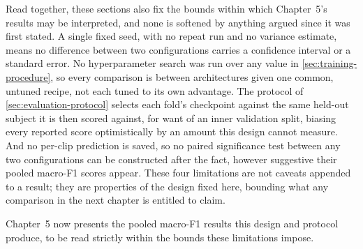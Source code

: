 Read together, these sections also fix the bounds within which Chapter~5's results may be interpreted, and none is softened by anything argued since it was first stated. A single fixed seed, with no repeat run and no variance estimate, means no difference between two configurations carries a confidence interval or a standard error. No hyperparameter search was run over any value in \autoref{sec:training-procedure}, so every comparison is between architectures given one common, untuned recipe, not each tuned to its own advantage. The protocol of \autoref{sec:evaluation-protocol} selects each fold's checkpoint against the same held-out subject it is then scored against, for want of an inner validation split, biasing every reported score optimistically by an amount this design cannot measure. And no per-clip prediction is saved, so no paired significance test between any two configurations can be constructed after the fact, however suggestive their pooled macro-F1 scores appear. These four limitations are not caveats appended to a result; they are properties of the design fixed here, bounding what any comparison in the next chapter is entitled to claim.

Chapter~5 now presents the pooled macro-F1 results this design and protocol produce, to be read strictly within the bounds these limitations impose.
